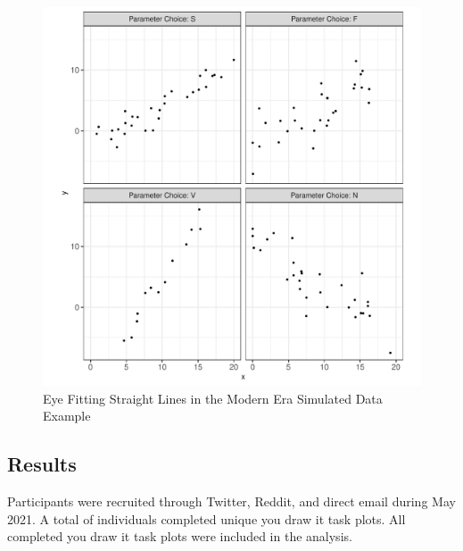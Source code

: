 \documentclass[print]{nuthesis}
\begin{document}
\begin{figure}[tbp]

{\centering \includegraphics[width=1\linewidth,]{thesis_files/figure-latex/eyefitting-simplot-1} 

}

\caption{Eye Fitting Straight Lines in the Modern Era Simulated Data Example}\label{fig:eyefitting-simplot}
\end{figure}

\hypertarget{results-1}{%
\subsection{Results}\label{results-1}}

Participants were recruited through Twitter, Reddit, and direct email during May 2021.
A total of  individuals completed  unique you draw it task plots.
All completed you draw it task plots were included in the analysis.
\end{document}

